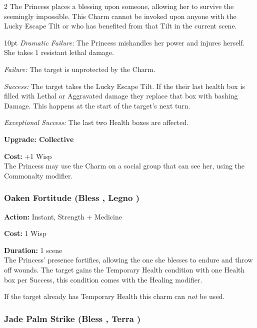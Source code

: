 \begin{multicols}{2}
\noindent The Princess places a blessing upon someone, allowing her to survive the seemingly impossible. This Charm cannot be invoked upon anyone with the Lucky Escape Tilt or who has benefited from that Tilt in the current scene. 

\begin{myindentpar}{10pt}    \emph{Dramatic Failure:} The Princess mishandles her power and injures herself. She takes 1 resistant lethal damage.

\emph{Failure:} The target is unprotected by the Charm. 

\emph{Success:} The target takes the Lucky Escape Tilt. If the their last health box is filled with Lethal or Aggravated damage they replace that box with bashing Damage. This happens at the start of the target's next turn. 

\emph{Exceptional Success:} The last two Health boxes are affected.

\textbf{Upgrade: Collective}

\noindent \textbf{Cost:} +1 Wisp \\

The Princess may use the Charm on a social group that can see her, using the Commonalty modifier. 

\end{myindentpar}


\subsubsection*{Oaken Fortitude (Bless \textbullet\textbullet\textbullet, Legno \textbullet)}

\noindent \textbf{Action:} Instant, Strength + Medicine

\noindent \textbf{Cost:} 1 Wisp

\noindent \textbf{Duration:} 1 scene \\

\noindent The Princess' presence fortifies, allowing the one she blesses to endure and throw off wounds. The target gains the Temporary Health condition with one Health box per Success, this condition comes with the Healing modifier. 

If the target already has Temporary Health this charm can \textit{not} be used. 

\subsubsection*{Jade Palm Strike (Bless \textbullet\textbullet\textbullet, Terra \textbullet\textbullet)}


\end{multicols}
